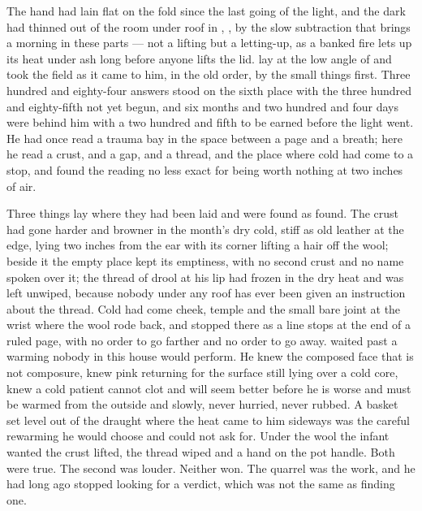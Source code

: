 
The hand had lain flat on the fold since the last going of the light, and the dark had thinned out of the room under  roof in , ,  by the slow subtraction that brings a morning in these parts --- not a lifting but a letting-up, as a banked fire lets up its heat under ash long before anyone lifts the lid.  lay at the low angle of  and took the field as it came to him, in the old order, by the small things first. Three hundred and eighty-four answers stood on the sixth place with the three hundred and eighty-fifth not yet begun, and six months and two hundred and four days were behind him with a two hundred and fifth to be earned before the light went. He had once read a trauma bay in the space between a page and a breath; here he read a crust, and a gap, and a thread, and the place where cold had come to a stop, and found the reading no less exact for being worth nothing at two inches of air.

Three things lay where they had been laid and were found as found. The crust had gone harder and browner in the month's dry cold, stiff as old leather at the edge, lying two inches from the ear with its corner lifting a hair off the wool; beside it the empty place kept its emptiness, with no second crust and no name spoken over it; the thread of drool at his lip had frozen in the dry heat and was left unwiped, because nobody under any roof has ever been given an instruction about the thread. Cold had come cheek, temple and the small bare joint at the wrist where the wool rode back, and stopped there as a line stops at the end of a ruled page, with no order to go farther and no order to go away.  waited past a warming nobody in this house would perform. He knew the composed face that is not composure, knew pink returning for the surface still lying over a cold core, knew a cold patient cannot clot and will seem better before he is worse and must be warmed from the outside and slowly, never hurried, never rubbed. A basket set level out of the draught where the heat came to him sideways was the careful rewarming he would choose and could not ask for. Under the wool the infant wanted the crust lifted, the thread wiped and a hand on the pot handle. Both were true. The second was louder. Neither won. The quarrel was the work, and he had long ago stopped looking for a verdict, which was not the same as finding one.

